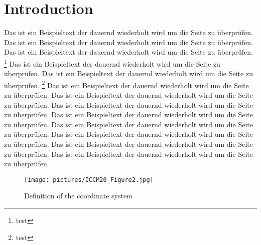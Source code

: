 \section{Introduction}
\label{cha:introduction}
Das ist ein Beispieltext der dauernd wiederholt wird um die Seite zu überprüfen.
Das ist ein Beispieltext der dauernd wiederholt wird um die Seite zu überprüfen.  Das ist ein Beispieltext der dauernd wiederholt wird um die Seite zu überprüfen. \footnote{test} Das ist ein Beispieltext der dauernd wiederholt wird um die Seite zu überprüfen. Das ist ein Beispieltext der dauernd wiederholt wird um die Seite zu überprüfen. \footnote{test} Das ist ein Beispieltext der dauernd wiederholt wird um die Seite zu überprüfen. Das ist ein Beispieltext der dauernd wiederholt wird um die Seite zu überprüfen. Das ist ein Beispieltext der dauernd wiederholt wird um die Seite zu überprüfen. Das ist ein Beispieltext der dauernd wiederholt wird um die Seite zu überprüfen. Das ist ein Beispieltext der dauernd wiederholt wird um die Seite zu überprüfen. Das ist ein Beispieltext der dauernd wiederholt wird um die Seite zu überprüfen. Das ist ein Beispieltext der dauernd wiederholt wird um die Seite zu überprüfen. Das ist ein Beispieltext der dauernd wiederholt wird um die Seite zu überprüfen. 
\begin{figure}[h]
	\centering
	\texttt{[image: pictures/ICCM20\_Figure2.jpg]}
	\caption{Definition of the coordinate system}
	\label{fig:arni}
\end{figure}
